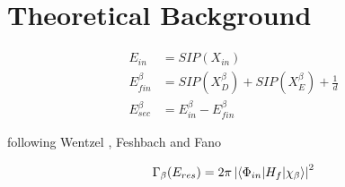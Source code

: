 \section{Theoretical Background}

\begin{align}
 E_{in}        &= SIP(X_{in}) \label{equation:E_in}\\          
 E_{fin}^\beta &= SIP(X_{D}^\beta) + SIP(X_{E}^\beta) + \frac 1d
           \label{equation:E_fin}\\                            
 E_{sec}^\beta &= E_{in}^\beta - E_{fin}^\beta \label{equation:E_sec}         
\end{align}


following Wentzel \cite{Wentzel27}, Feshbach\cite{Feshbach58,Feshbach62}
and Fano \cite{Fano61}

\begin{equation}
 \Gamma_{\beta}(E_{res}) = 2\pi \left|
                           \braket{\Phi_{in}| H_f |\chi_{\beta}}
                           \right|^2
\end{equation}

